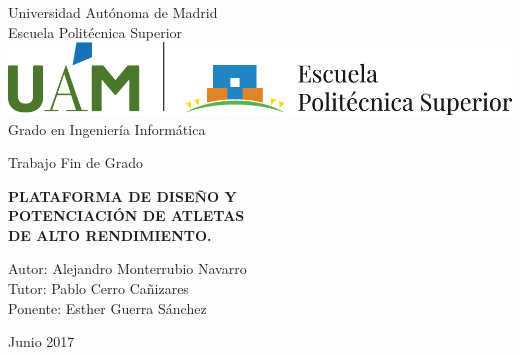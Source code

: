 \documentclass[12pt,a4paper]{report}
\begin{document}
\begin{titlepage}
    \centering
    \vspace*{1cm}
    
    \large{Universidad Autónoma de Madrid}\\
    Escuela Politécnica Superior\\
    \vspace{1cm}
    \includegraphics[width=1\textwidth]{uam.png}\\
    \vspace{0.5cm}
    Grado en Ingeniería Informática\\
    \vspace{0.5cm}
    
    \large {Trabajo Fin de Grado}\\
    \vspace{1cm}
    
    \textbf{\LARGE PLATAFORMA DE DISEÑO Y}\\
    \textbf{\LARGE POTENCIACIÓN DE ATLETAS}\\
    \textbf{\LARGE DE ALTO RENDIMIENTO.}\\
    \vspace{2cm}
    
    Autor: Alejandro Monterrubio Navarro\\
    Tutor: Pablo Cerro Cañizares\\
    Ponente: Esther Guerra Sánchez\\
    \vspace{1cm}
    
    Junio 2017
    \vfill
    
\end{titlepage}

\end{document}
